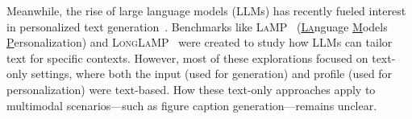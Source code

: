 Meanwhile, the rise of large language models (LLMs) has recently fueled interest in personalized text generation~\cite{zhang2024personalization,wozniak2024personalized}. 
Benchmarks like \textsc{LaMP}~\cite{salemi-etal-2024-lamp} (\ul{\textsc{La}}nguage \ul{\textsc{M}}odels \ul{\textsc{P}}ersonalization) and \textsc{LongLaMP}~\cite{kumar2024longlamp} were created to study how LLMs can tailor text for specific contexts.
However, most of these explorations focused on text-only settings, where both the input (used for generation) and profile (used for personalization) were text-based.
How these text-only approaches apply to multimodal scenarios---such as figure caption generation---remains unclear.


